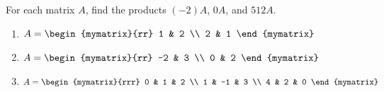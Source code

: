 \documentclass{ximera}
\begin{document}
\begin{problem}
  For each matrix $A$, find the products $(-2)A$, $0A$, and $512A$.
  \begin{enumerate}
  \item
    $A = \begin{mymatrix}{rr}
      1 & 2 \\
      2 & 1
    \end{mymatrix}$
  \item
    $A = \begin{mymatrix}{rr}
      -2 & 3 \\
      0 & 2
    \end{mymatrix}$
  \item
    $A = \begin{mymatrix}{rrr}
      0 & 1 & 2 \\
      1 & -1 & 3 \\
      4 & 2 & 0
    \end{mymatrix}$
  \end{enumerate}
\end{problem}
\end{document}
